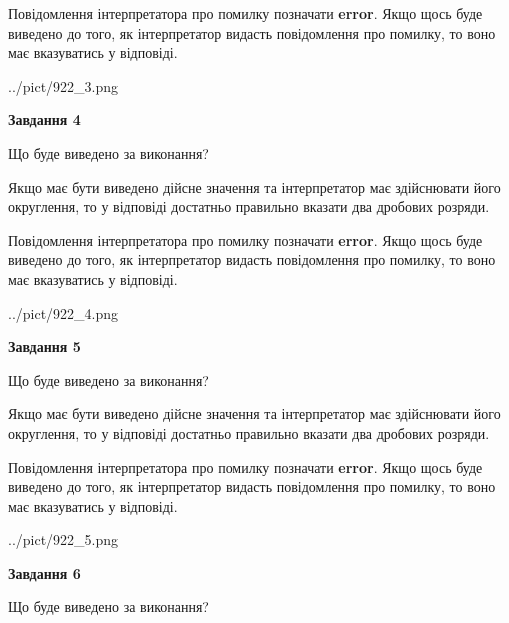 \documentclass[12pt, ukrainian]{article}
\begin{document}
{\begin {Large}
Повідомлення інтерпретатора про помилку позначати \textbf{error}.
Якщо щось буде виведено до того, як інтерпретатор видасть повідомлення про помилку, 
то воно має вказуватись у відповіді. \par

\begin{center}
	{../pict/922_3.png}
\end{center}
\newpage

{\begin {center}\textbf{Завдання 4}\end {center}}\par
Що буде виведено за виконання? \par

Якщо має бути виведено дійсне значення та інтерпретатор має здійснювати його округлення, 
то у відповіді достатньо правильно вказати два дробових розряди.

Повідомлення інтерпретатора про помилку позначати \textbf{error}.
Якщо щось буде виведено до того, як інтерпретатор видасть повідомлення про помилку, 
то воно має вказуватись у відповіді. \par

\begin{center}
	{../pict/922_4.png}
\end{center}
\newpage

{\begin {center}\textbf{Завдання 5}\end {center}}\par
Що буде виведено за виконання? \par

Якщо має бути виведено дійсне значення та інтерпретатор має здійснювати його округлення, 
то у відповіді достатньо правильно вказати два дробових розряди.

Повідомлення інтерпретатора про помилку позначати \textbf{error}.
Якщо щось буде виведено до того, як інтерпретатор видасть повідомлення про помилку, 
то воно має вказуватись у відповіді. \par

\begin{center}
	{../pict/922_5.png}
\end{center}
\newpage

{\begin {center}\textbf{Завдання 6}\end {center}}\par
Що буде виведено за виконання? \par


\end{Large}}
\end{document}
